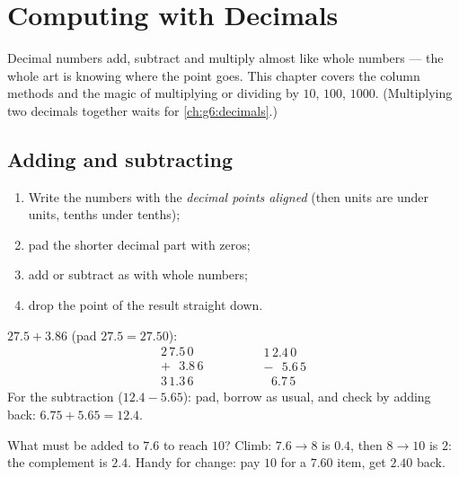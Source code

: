 \chapter{Computing with Decimals}\label{ch:g5:decimalops}

Decimal numbers add, subtract and multiply almost like whole numbers
--- the whole art is knowing where the point goes. This chapter
covers the column methods and the magic of multiplying or dividing by
$10$, $100$, $1000$. (Multiplying two decimals together waits for
\cref{ch:g6:decimals}.)

\section{Adding and subtracting}

\begin{method}\label{met:g5:decimalops:addsub}
\begin{enumerate}
  \item Write the numbers with the \emph{decimal points aligned}
        (then units are under units, tenths under tenths);
  \item pad the shorter decimal part with zeros;
  \item add or subtract as with whole numbers;
  \item drop the point of the result straight down.
\end{enumerate}
\end{method}

\begin{example}\label{ex:g5:decimalops:addsub}
$27.5 + 3.86$ (pad $27.5 = 27.50$):
\[
\begin{array}{r}
2\,7.5\,0 \\
+\ \ \ 3.8\,6 \\
\hline
3\,1.3\,6
\end{array}
\qquad\qquad
\begin{array}{r}
1\,2.4\,0 \\
-\ \ \ 5.6\,5 \\
\hline
\ \ \,6.7\,5
\end{array}
\]
For the subtraction ($12.4 - 5.65$): pad, borrow as usual, and check
by adding back: $6.75 + 5.65 = 12.4$.
\end{example}

\begin{example}\label{ex:g5:decimalops:complement}
What must be added to $7.6$ to reach $10$? Climb: $7.6 \to 8$ is
$0.4$, then $8 \to 10$ is $2$: the complement is $2.4$. Handy for
change: pay $10$ for a $7.60$ item, get $2.40$ back.
\end{example}

